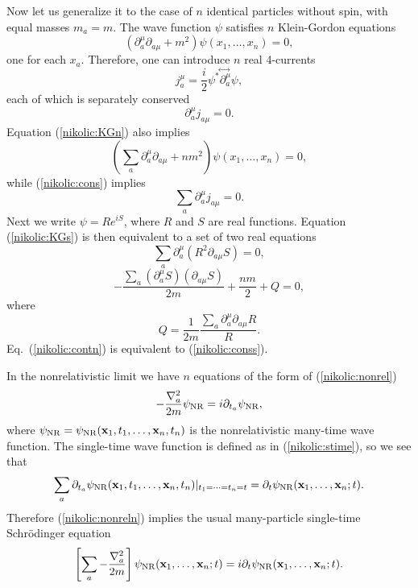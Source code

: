 \documentclass[12pt,twoside]{report} %
\begin{document}
Now let us generalize it to the case of $n$ identical particles without spin,
with equal masses $m_a=m$.
The wave function $\psi$ satisfies $n$ Klein-Gordon equations
\begin{equation}\label{nikolic:KGn}
(\partial_a^{\mu}\partial_{a\mu}+m^2)\psi(x_1,\ldots ,x_n)=0 ,
\end{equation}
one for each $x_a$.
Therefore, one can introduce $n$ real 4-currents
\begin{equation}\label{nikolic:curn}
j^{\mu}_a=\frac{i}{2}\psi^* \!\stackrel{\leftrightarrow\;}{\partial^{\mu}_a}\! \psi ,
\end{equation}
each of which is separately conserved
\begin{equation}\label{nikolic:cons}
\partial^{\mu}_a j_{a\mu}=0.
\end{equation}
Equation (\ref{nikolic:KGn}) also implies
\begin{equation}\label{nikolic:KGs}
\left( \sum_a\partial_a^{\mu}\partial_{a\mu}+nm^2 \right)
\psi(x_1,\ldots ,x_n)=0 ,
\end{equation}
while (\ref{nikolic:cons}) implies
\begin{equation}\label{nikolic:conss}
\sum_a\partial^{\mu}_a j_{a\mu}=0.
\end{equation}
Next we write $\psi=Re^{iS}$, where $R$ and $S$ are real
functions. Equation (\ref{nikolic:KGs})
is then equivalent to a set of two real equations
\begin{equation}\label{nikolic:contn}
\sum_a\partial_a^{\mu}(R^2\partial_{a\mu}S)=0,
\end{equation}
\begin{equation}\label{nikolic:HJn}
-\frac{\sum_a(\partial_a^{\mu}S)(\partial_{a\mu}S)}{2m} +\frac{nm}{2} +Q=0,
\end{equation}
where
\begin{equation}\label{nikolic:Q}
Q=\frac{1}{2m}\frac{\sum_a\partial_a^{\mu}\partial_{a\mu}R}{R} .
\end{equation}
Eq.~(\ref{nikolic:contn}) is equivalent to (\ref{nikolic:conss}).

In the nonrelativistic limit we have $n$ equations of the form of (\ref{nikolic:nonrel})
\begin{equation}\label{nikolic:nonreln}
-\frac{\nabla_a^2}{2m}\psi_{\rm NR}=i\partial_{t_a}\psi_{\rm NR},
\end{equation}
where $\psi_{\rm NR}=\psi_{\rm NR}({\bf x}_1,t_1,\ldots,{\bf x}_n,t_n)$
is the nonrelativistic many-time wave function.
The single-time wave function is defined as in (\ref{nikolic:stime}), so we see that
\begin{equation}
\sum_a \partial_{t_a}\psi_{\rm NR}({\bf x}_1,t_1,\ldots,{\bf x}_n,t_n) 
|_{t_1=\cdots=t_n=t}  = \partial_{t} \psi_{\rm NR}({\bf x}_1,\ldots,{\bf x}_n;t) .
\end{equation}
Therefore (\ref{nikolic:nonreln}) implies the usual many-particle single-time Schr\"odinger
equation
\begin{equation}\label{nikolic:nonrelns}
\left[ \sum_a -\frac{\nabla_a^2}{2m} \right] \psi_{\rm NR}({\bf x}_1,\ldots,{\bf x}_n;t)
=i\partial_{t}\psi_{\rm NR}({\bf x}_1,\ldots,{\bf x}_n;t) .
\end{equation}
\end{document}
